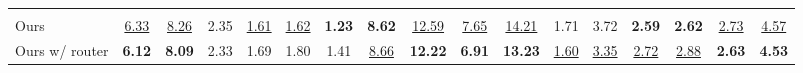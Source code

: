 \documentclass{article}
\begin{document}
\begin{table}[t]
{\begin{tabular}{lcccccccccccccccc}
\rowcolor{headerblue}
\multicolumn{17}{l}{\textit{Our model}} \\
Ours
& \underline{6.33} & \underline{8.26} & 2.35 & \underline{1.61} & \underline{1.62} & \textbf{1.23} & \textbf{8.62} & \underline{12.59} & \underline{7.65} & \underline{14.21} & 1.71 & 3.72 & \textbf{2.59} & \textbf{2.62} & \underline{2.73} & \underline{4.57} \\
Ours w/ router
& \textbf{6.12} & \textbf{8.09} & 2.33 & 1.69 & 1.80 & 1.41 & \underline{8.66} & \textbf{12.22} & \textbf{6.91} & \textbf{13.23} & \underline{1.60} & \underline{3.35} & \underline{2.72} & \underline{2.88} & \textbf{2.63} & \textbf{4.53} \\
\bottomrule
\end{tabular}
}
\end{table}
\end{document}
